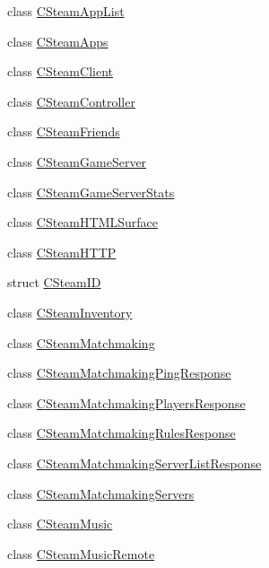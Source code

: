 \begin{DoxyCompactItemize}
\item 
class \hyperlink{classValve_1_1Steamworks_1_1CSteamAppList}{C\+Steam\+App\+List}
\item 
class \hyperlink{classValve_1_1Steamworks_1_1CSteamApps}{C\+Steam\+Apps}
\item 
class \hyperlink{classValve_1_1Steamworks_1_1CSteamClient}{C\+Steam\+Client}
\item 
class \hyperlink{classValve_1_1Steamworks_1_1CSteamController}{C\+Steam\+Controller}
\item 
class \hyperlink{classValve_1_1Steamworks_1_1CSteamFriends}{C\+Steam\+Friends}
\item 
class \hyperlink{classValve_1_1Steamworks_1_1CSteamGameServer}{C\+Steam\+Game\+Server}
\item 
class \hyperlink{classValve_1_1Steamworks_1_1CSteamGameServerStats}{C\+Steam\+Game\+Server\+Stats}
\item 
class \hyperlink{classValve_1_1Steamworks_1_1CSteamHTMLSurface}{C\+Steam\+H\+T\+M\+L\+Surface}
\item 
class \hyperlink{classValve_1_1Steamworks_1_1CSteamHTTP}{C\+Steam\+H\+T\+T\+P}
\item 
struct \hyperlink{structValve_1_1Steamworks_1_1CSteamID}{C\+Steam\+I\+D}
\item 
class \hyperlink{classValve_1_1Steamworks_1_1CSteamInventory}{C\+Steam\+Inventory}
\item 
class \hyperlink{classValve_1_1Steamworks_1_1CSteamMatchmaking}{C\+Steam\+Matchmaking}
\item 
class \hyperlink{classValve_1_1Steamworks_1_1CSteamMatchmakingPingResponse}{C\+Steam\+Matchmaking\+Ping\+Response}
\item 
class \hyperlink{classValve_1_1Steamworks_1_1CSteamMatchmakingPlayersResponse}{C\+Steam\+Matchmaking\+Players\+Response}
\item 
class \hyperlink{classValve_1_1Steamworks_1_1CSteamMatchmakingRulesResponse}{C\+Steam\+Matchmaking\+Rules\+Response}
\item 
class \hyperlink{classValve_1_1Steamworks_1_1CSteamMatchmakingServerListResponse}{C\+Steam\+Matchmaking\+Server\+List\+Response}
\item 
class \hyperlink{classValve_1_1Steamworks_1_1CSteamMatchmakingServers}{C\+Steam\+Matchmaking\+Servers}
\item 
class \hyperlink{classValve_1_1Steamworks_1_1CSteamMusic}{C\+Steam\+Music}
\item 
class \hyperlink{classValve_1_1Steamworks_1_1CSteamMusicRemote}{C\+Steam\+Music\+Remote}

\end{DoxyCompactItemize}
